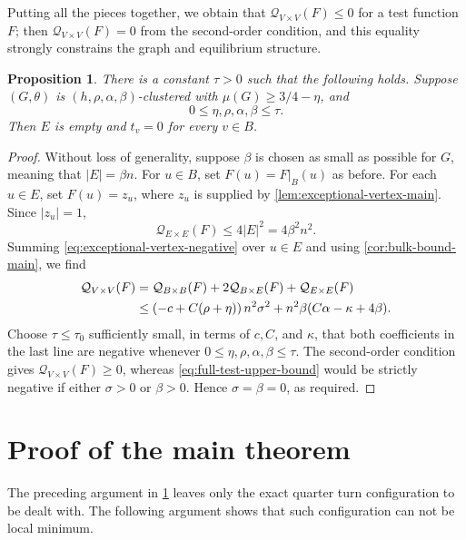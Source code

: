 \documentclass[reqno,11pt]{amsart}
\newtheorem{proposition}{Proposition}
\theoremstyle{definition}
\newcommand{\cQ}{\mathcal{Q}}
\newcommand{\abs}[1]{\left\lvert #1\right\rvert}
\newcommand{\paren}[1]{\left(#1\right)}
\begin{document}
Putting all the pieces together, we obtain that $\mathcal{Q}_{V \times V}(F) \leq 0$ for a test function $F$; then $\mathcal{Q}_{V \times V}(F) = 0$ from the second-order condition, and this equality strongly constrains the graph and equilibrium structure.

\begin{proposition}\label{prop:eliminate-exceptional-vtx-and-perturbation}
There is a constant $\tau>0$ such that the following holds.  Suppose
$(G,\theta)$ is $(h,\rho,\alpha,\beta)$-clustered with
$\mu(G)\ge3/4-\eta$, and
\[
    0\le\eta,\rho,\alpha,\beta\le\tau.
\]
Then $E$ is empty and $t_v=0$ for every $v\in B$.
\end{proposition}

\begin{proof}
Without loss of generality, suppose $\beta$ is chosen as small as possible for $G$, meaning that $|E| = \beta n$. For $u\in B$, set $F(u)=F\vert_B(u)$ as before.  For each $u\in E$, set
$F(u)=z_u$, where $z_u$ is supplied by
\cref{lem:exceptional-vertex-main}.  Since $\abs{z_u}=1$,
\[
    \cQ_{E\times E}(F)\le4\abs E^2=4\beta^2n^2.
\]
Summing \eqref{eq:exceptional-vertex-negative} over $u\in E$ and using
\cref{cor:bulk-bound-main}, we find
\begin{align}\label{eq:full-test-upper-bound}
\cQ_{V\times V}(F)
&=\cQ_{B\times B}(F)+2\cQ_{B\times E}(F)
  +\cQ_{E\times E}(F)\notag\\
&\le\paren{-c+C(\rho+\eta)}n^2\sigma^2
  +n^2\beta(C\alpha-\kappa+4\beta).
\end{align}
Choose $\tau\le\tau_0$ sufficiently small, in terms of
$c,C$, and $\kappa$, that both coefficients in the last line are
negative whenever $0\le\eta,\rho,\alpha,\beta\le\tau$.
The second-order condition gives $\cQ_{V\times V}(F)\ge0$, whereas
\eqref{eq:full-test-upper-bound} would be strictly negative if either
$\sigma>0$ or $\beta>0$.  Hence $\sigma=\beta=0$, as required.
\end{proof}

\section{Proof of the main theorem}
\label{sec:exact-four-clusters}

The preceding argument in \cref{prop:eliminate-exceptional-vtx-and-perturbation} leaves only the exact quarter turn configuration to be dealt with. The following argument shows that such configuration can not be local minimum.
\end{document}
